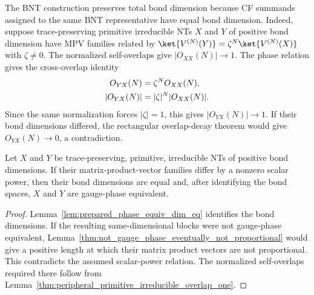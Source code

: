 The BNT construction preserves total bond dimension because CF summands assigned
to the same BNT representative have equal bond dimension. Indeed, suppose
trace-preserving primitive irreducible NTs $X$ and $Y$ of positive bond dimension
have MPV families related by
$\ket{V^{(N)}(Y)}=\zeta^N\ket{V^{(N)}(X)}$ with $\zeta\neq0$. The normalized
self-overlaps give $|O_{XX}(N)|\to 1$. The phase relation gives the
cross-overlap identity
\begin{align}
    O_{YX}(N)   & =\zeta^N O_{XX}(N),
    \notag                                \\
    |O_{YX}(N)| & =|\zeta|^N |O_{XX}(N)|.
    \notag
\end{align}
Since the same normalization forces $|\zeta|=1$, this gives
$|O_{YX}(N)|\to 1$.
If their bond dimensions differed, the rectangular overlap-decay theorem would
give $O_{YX}(N)\to 0$, a contradiction.

\begin{lemma}%
    \label{thm:prepared_phase_equiv_gauge}
    \leanok
    Let $X$ and $Y$ be trace-preserving, primitive, irreducible NTs of positive
    bond dimensions. If their matrix-product-vector families differ by a
    nonzero scalar power, then their bond dimensions are equal and, after
    identifying the bond spaces, $X$ and $Y$ are gauge-phase equivalent.
\end{lemma}

\begin{proof}\leanok
    Lemma~\ref{lem:prepared_phase_equiv_dim_eq} identifies the bond dimensions.
    If the resulting same-dimensional blocks were not gauge-phase equivalent,
    Lemma~\ref{thm:not_gauge_phase_eventually_not_proportional} would give a
    positive length at which their matrix product vectors are not proportional.
    This contradicts the assumed scalar-power relation. The normalized
    self-overlaps required there follow from
    Lemma~\ref{thm:peripheral_primitive_irreducible_overlap_one}.
\end{proof}

